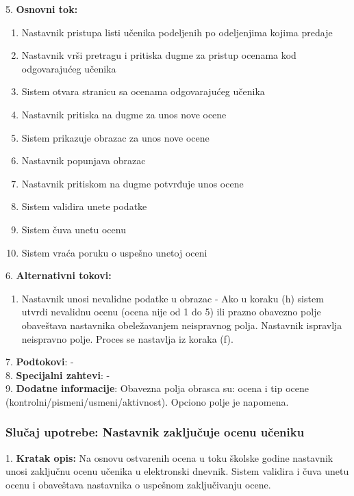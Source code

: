\documentclass{article}
\begin{document}
5. \textbf{Osnovni tok:} 
\begin{enumerate} [label=(\alph*)]
\item Nastavnik pristupa listi učenika podeljenih po odeljenjima kojima predaje
\item Nastavnik vrši pretragu i pritiska dugme za pristup ocenama kod odgovarajućeg učenika
\item Sistem otvara stranicu sa ocenama odgovarajućeg učenika
\item Nastavnik pritiska na dugme za unos nove ocene
\item Sistem prikazuje obrazac za unos nove ocene
\item Nastavnik popunjava obrazac
\item Nastavnik pritiskom na dugme potvrđuje unos ocene
\item Sistem validira unete podatke
\item Sistem čuva unetu ocenu
\item Sistem vraća poruku o uspešno unetoj oceni
\end{enumerate}

6. \textbf{Alternativni tokovi:}
\begin{enumerate} [label=(\roman*)]
\item Nastavnik unosi nevalidne podatke u obrazac - Ako u koraku (h) sistem utvrdi nevalidnu ocenu (ocena nije od 1 do 5) ili prazno obavezno polje obaveštava nastavnika obeležavanjem neispravnog polja. Nastavnik ispravlja neispravno polje. Proces se nastavlja iz koraka (f).
\end{enumerate}

7. \textbf{Podtokovi}: - \\

8. \textbf{Specijalni zahtevi}: - \\

9. \textbf{Dodatne informacije}: Obavezna polja obrasca su: ocena i tip ocene (kontrolni/pismeni/usmeni/aktivnost). Opciono polje je napomena. \\


\subsubsection{Slučaj upotrebe: Nastavnik zaključuje ocenu učeniku} 
1. \textbf{Kratak opis:} Na osnovu ostvarenih ocena u toku školske godine nastavnik unosi zaključnu ocenu učenika u elektronski dnevnik. Sistem validira i čuva unetu ocenu i obaveštava nastavnika o uspešnom zaključivanju ocene. \\
\end{document}
